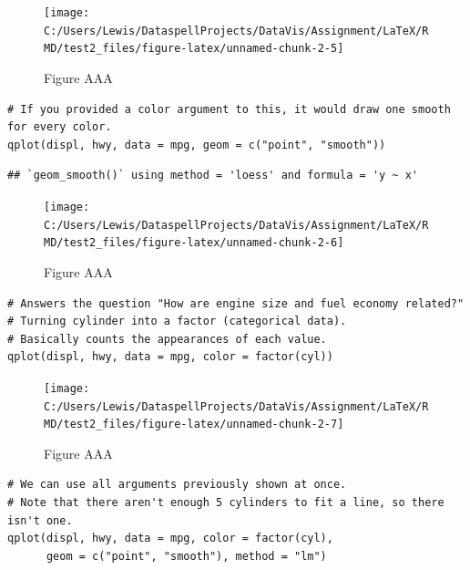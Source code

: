 \begin{figure}[H]

{\centering \texttt{[image: C:/Users/Lewis/DataspellProjects/DataVis/Assignment/LaTeX/RMD/test2\_files/figure-latex/unnamed-chunk-2-5]} 

}

\caption{Figure AAA}\label{fig:unnamed-chunk-2-5}
\end{figure}

\begin{verbatim}
# If you provided a color argument to this, it would draw one smooth for every color.
qplot(displ, hwy, data = mpg, geom = c("point", "smooth"))
\end{verbatim}

\begin{verbatim}
## `geom_smooth()` using method = 'loess' and formula = 'y ~ x'
\end{verbatim}

\begin{figure}[H]

{\centering \texttt{[image: C:/Users/Lewis/DataspellProjects/DataVis/Assignment/LaTeX/RMD/test2\_files/figure-latex/unnamed-chunk-2-6]} 

}

\caption{Figure AAA}\label{fig:unnamed-chunk-2-6}
\end{figure}

\begin{verbatim}
# Answers the question "How are engine size and fuel economy related?"
# Turning cylinder into a factor (categorical data).
# Basically counts the appearances of each value.
qplot(displ, hwy, data = mpg, color = factor(cyl))
\end{verbatim}

\begin{figure}[H]

{\centering \texttt{[image: C:/Users/Lewis/DataspellProjects/DataVis/Assignment/LaTeX/RMD/test2\_files/figure-latex/unnamed-chunk-2-7]} 

}

\caption{Figure AAA}\label{fig:unnamed-chunk-2-7}
\end{figure}

\begin{verbatim}
# We can use all arguments previously shown at once.
# Note that there aren't enough 5 cylinders to fit a line, so there isn't one.
qplot(displ, hwy, data = mpg, color = factor(cyl),
      geom = c("point", "smooth"), method = "lm")
\end{verbatim}

